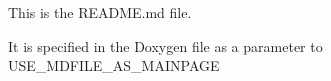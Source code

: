 This is the README.\+md file.

It is specified in the Doxygen file as a parameter to USE\+\_\+\+MDFILE\+\_\+\+AS\+\_\+\+MAINPAGE 